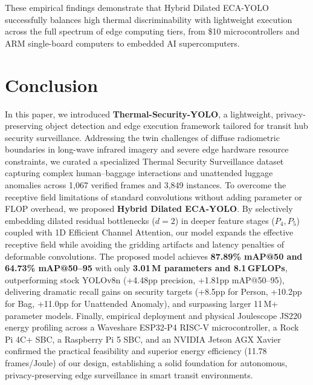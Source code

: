 \documentclass[journal,twoside,web]{ieeecolor}
\begin{document}
These empirical findings demonstrate that Hybrid Dilated ECA-YOLO successfully balances high thermal discriminability with lightweight execution across the full spectrum of edge computing tiers, from \$10 microcontrollers and ARM single-board computers to embedded AI supercomputers.

\section{Conclusion}
\label{sec:conclusion}
In this paper, we introduced \textbf{Thermal-Security-YOLO}, a lightweight, privacy-preserving object detection and edge execution framework tailored for transit hub security surveillance. Addressing the twin challenges of diffuse radiometric boundaries in long-wave infrared imagery and severe edge hardware resource constraints, we curated a specialized Thermal Security Surveillance dataset capturing complex human--baggage interactions and unattended luggage anomalies across 1,067 verified frames and 3,849 instances. To overcome the receptive field limitations of standard convolutions without adding parameter or FLOP overhead, we proposed \textbf{Hybrid Dilated ECA-YOLO}. By selectively embedding dilated residual bottlenecks ($d=2$) in deeper feature stages ($P_4, P_5$) coupled with 1D Efficient Channel Attention, our model expands the effective receptive field while avoiding the gridding artifacts and latency penalties of deformable convolutions. The proposed model achieves \textbf{87.89\% mAP@50 and 64.73\% mAP@50--95} with only \textbf{3.01\,M parameters and 8.1\,GFLOPs}, outperforming stock YOLOv8n (+4.48pp precision, +1.81pp mAP@50--95), delivering dramatic recall gains on security targets (+8.5pp for Person, +10.2pp for Bag, +11.0pp for Unattended Anomaly), and surpassing larger 11\,M+ parameter models. Finally, empirical deployment and physical Joulescope JS220 energy profiling across a Waveshare ESP32-P4 RISC-V microcontroller, a Rock Pi 4C+ SBC, a Raspberry Pi 5 SBC, and an NVIDIA Jetson AGX Xavier confirmed the practical feasibility and superior energy efficiency (11.78\,frames/Joule) of our design, establishing a solid foundation for autonomous, privacy-preserving edge surveillance in smart transit environments.



\end{document}
